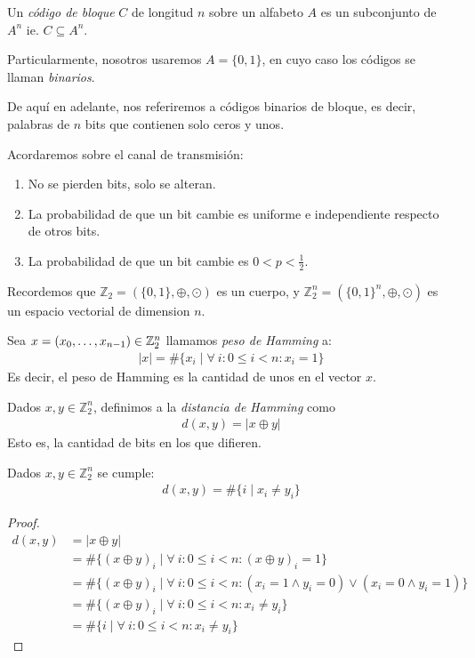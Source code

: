 \begin{definition}
Un \emph{código de bloque} $C$ de longitud $n$ sobre un alfabeto $A$ es un subconjunto de $A^n$ ie. $C \subseteq A^n$.

Particularmente, nosotros usaremos $A = \{0,1\}$, en cuyo caso los códigos se llaman \emph{binarios}.

De aquí en adelante, nos referiremos a códigos binarios de bloque, es decir, palabras de $n$ bits que contienen solo ceros y unos.
\end{definition}

Acordaremos sobre el canal de transmisión:
\begin{enumerate}
\item No se pierden bits, solo se alteran.
\item La probabilidad de que un bit cambie es uniforme e independiente respecto de otros bits.
\item La probabilidad de que un bit cambie es $0 < p < \frac{1}{2}$.
\end{enumerate}
\begin{definition}
Recordemos que $\mathbb{Z}_2 = (\{0,1\}, \oplus, \odot)$ es un cuerpo, y ${\mathbb{Z}_2^n} = (\{0,1\}^n, \oplus, \odot)$ es un espacio vectorial de dimension $n$.
\end{definition}

\begin{definition}
Sea $x = (x_0,\mathellipsis, x_{n-1}) \in \mathbb{Z}_2^n$ llamamos \emph{peso de Hamming} a: \begin{align}
|x| = \#\{x_i \mid \forall~ i: 0\le i < n : x_i = 1\}
\end{align}
Es decir, el peso de Hamming es la cantidad de unos en el vector $x$.
\end{definition}

\begin{definition}
Dados $x,y \in \mathbb{Z}_2^n$, definimos a la \emph{distancia de Hamming} como
\begin{align}
d(x,y) = |x\oplus y|
\end{align}
Esto es, la cantidad de bits en los que difieren.
\end{definition}

\begin{proposition}
Dados $x,y \in \mathbb{Z}_2^n$ se cumple: \begin{align}
d(x,y) = \#\{i\mid x_i \neq y_i\}
\end{align}
\end{proposition}
\begin{proof}
\begin{align}
d(x,y) &= |x\oplus y| \\
&= \#\{(x\oplus y)_i \mid \forall~ i : 0 \le i < n: (x\oplus y)_i = 1\} \\
&= \#\{(x\oplus y)_i \mid \forall~ i : 0 \le i < n: (x_i = 1 \wedge y_i = 0) \vee (x_i = 0 \wedge y_i = 1)\} \\
&= \#\{(x\oplus y)_i \mid \forall~ i: 0 \le i < n: x_i \neq y_i\}\\
&= \#\{i \mid \forall~ i: 0 \le i < n: x_i \neq y_i\}
\end{align}
\end{proof}

